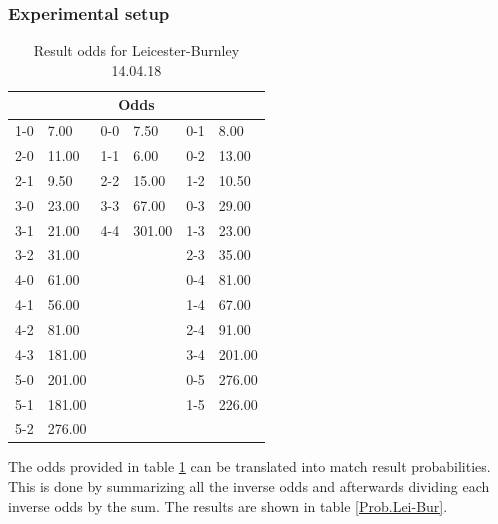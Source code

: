 \subsubsection{Experimental setup}



\begin{table}[H]
\centering
\caption{Result odds for Leicester-Burnley 14.04.18}
\label{Leicester-Burnley}
\begin{tabular}{|ll|ll|ll|}
\multicolumn{6}{c}{Odds}                   \\
\hline
1-0 & 7.00   & 0-0 & 7.50   & 0-1 & 8.00   \\
2-0 & 11.00  & 1-1 & 6.00   & 0-2 & 13.00  \\
2-1 & 9.50   & 2-2 & 15.00  & 1-2 & 10.50  \\
3-0 & 23.00  & 3-3 & 67.00  & 0-3 & 29.00  \\
3-1 & 21.00  & 4-4 & 301.00 & 1-3 & 23.00  \\
3-2 & 31.00  &     &        & 2-3 & 35.00  \\
4-0 & 61.00  &     &        & 0-4 & 81.00  \\
4-1 & 56.00  &     &        & 1-4 & 67.00  \\
4-2 & 81.00  &     &        & 2-4 & 91.00  \\
4-3 & 181.00 &     &        & 3-4 & 201.00 \\
5-0 & 201.00 &     &        & 0-5 & 276.00 \\
5-1 & 181.00 &     &        & 1-5 & 226.00 \\
5-2 & 276.00 &     &        &     &        \\
\hline
\end{tabular}
\end{table}

The odds provided in table \ref{Leicester-Burnley} can be translated into match result probabilities. This is done by summarizing all the inverse odds and afterwards dividing each inverse odds by the sum. The results are shown in table \ref{Prob.Lei-Bur}.


